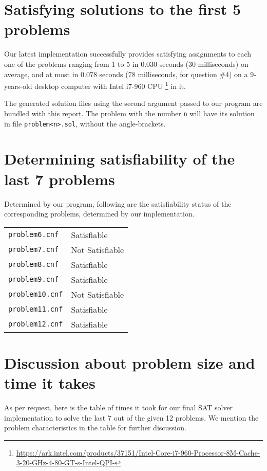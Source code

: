 \documentclass{article}
\begin{document}
\section{Satisfying solutions to the first 5 problems}

Our latest implementation successfully provides satisfying
assignments to each one of the problems ranging from 1 to 5
in 0.030 seconds (30 milliseconds) on average, and at most
in 0.078 seconds (78 milliseconds, for question \#4) on a
9-years-old desktop computer
with Intel\textsuperscript{\textregistered} i7-960 CPU%
\footnote{\url{https://ark.intel.com/products/37151/Intel-Core-i7-960-Processor-8M-Cache-3-20-GHz-4-80-GT-s-Intel-QPI-}}
in it.

The generated solution files using the second argument
passed to our program are bundled with this report.
The problem with the number \texttt{n} will have its
solution in file \texttt{problem<n>.sol}, without
the angle-brackets.

\section{Determining satisfiability of the last 7 problems}

Determined by our program, following are the
satisfiability status of the corresponding problems,
determined by our implementation.

\begin{center}
    \begin{tabular}{l l}
        \texttt{problem6.cnf}  & Satisfiable \\
        \texttt{problem7.cnf}  & Not Satisfiable \\
        \texttt{problem8.cnf}  & Satisfiable \\
        \texttt{problem9.cnf}  & Satisfiable \\
        \texttt{problem10.cnf} & Not Satisfiable \\
        \texttt{problem11.cnf} & Satisfiable \\
        \texttt{problem12.cnf} & Satisfiable
    \end{tabular}
\end{center}

\section{Discussion about problem size and time it takes}

As per request, here is the table of times it took for our final
SAT solver implementation to solve the last 7 out of the given 12
problems. We mention the problem characteristics in the table for
further discussion.
\end{document}

